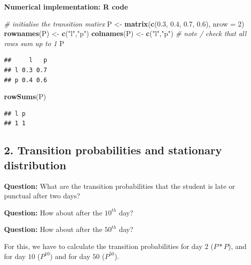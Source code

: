 \documentclass[]{article}
\newenvironment{Shaded}{\begin{snugshade}}{\end{snugshade}}
\newcommand{\CommentTok}[1]{\textcolor[rgb]{0.56,0.35,0.01}{\textit{#1}}}
\newcommand{\DataTypeTok}[1]{\textcolor[rgb]{0.13,0.29,0.53}{#1}}
\newcommand{\DecValTok}[1]{\textcolor[rgb]{0.00,0.00,0.81}{#1}}
\newcommand{\FloatTok}[1]{\textcolor[rgb]{0.00,0.00,0.81}{#1}}
\newcommand{\KeywordTok}[1]{\textcolor[rgb]{0.13,0.29,0.53}{\textbf{#1}}}
\newcommand{\NormalTok}[1]{#1}
\newcommand{\OperatorTok}[1]{\textcolor[rgb]{0.81,0.36,0.00}{\textbf{#1}}}
\newcommand{\StringTok}[1]{\textcolor[rgb]{0.31,0.60,0.02}{#1}}
\begin{document}
\textbf{Numerical implementation: R code}

\begin{Shaded}
\begin{Highlighting}[]
\CommentTok{# initialise the transition matirx}
\NormalTok{P <-}\StringTok{  }\KeywordTok{matrix}\NormalTok{(}\KeywordTok{c}\NormalTok{(}\FloatTok{0.3}\NormalTok{, }\FloatTok{0.4}\NormalTok{, }\FloatTok{0.7}\NormalTok{, }\FloatTok{0.6}\NormalTok{), }\DataTypeTok{nrow =} \DecValTok{2}\NormalTok{)}
\KeywordTok{rownames}\NormalTok{(P) <-}\StringTok{ }\KeywordTok{c}\NormalTok{(}\StringTok{"l"}\NormalTok{,}\StringTok{"p"}\NormalTok{)}
\KeywordTok{colnames}\NormalTok{(P) <-}\StringTok{ }\KeywordTok{c}\NormalTok{(}\StringTok{"l"}\NormalTok{,}\StringTok{"p"}\NormalTok{)}
\CommentTok{# note / check that all rows sum up to 1}
\NormalTok{P}
\end{Highlighting}
\end{Shaded}

\begin{verbatim}
##     l   p
## l 0.3 0.7
## p 0.4 0.6
\end{verbatim}

\begin{Shaded}
\begin{Highlighting}[]
\KeywordTok{rowSums}\NormalTok{(P)}
\end{Highlighting}
\end{Shaded}

\begin{verbatim}
## l p 
## 1 1
\end{verbatim}

\hypertarget{transition-probabilities-and-stationary-distribution}{%
\subsection{2. Transition probabilities and stationary
distribution}\label{transition-probabilities-and-stationary-distribution}}

\textbf{Question:} What are the transition probabilities that the
student is late or punctual after two days?

\textbf{Question:} How about after the \(10^{th}\) day?

\textbf{Question:} How about after the \(50^{th}\) day?

For this, we have to calculate the transition probabilities for day 2
(\(P *P\)), and for day \(10\) (\(P^{10}\)) and for day \(50\)
(\(P^{50}\)).

\begin{Shaded}
\end{Shaded}
\end{document}
